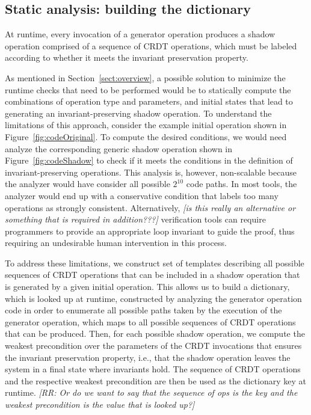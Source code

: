 \subsection{Static analysis: building the dictionary}

At runtime, every invocation of a generator operation produces a
shadow operation comprised of a sequence of CRDT operations, which
must be labeled according to whether it meets the invariant
preservation property.

As mentioned in Section~\ref{sect:overview}, a possible solution to
minimize the runtime checks that need to be performed would be to
statically compute the combinations of operation type and parameters,
and initial states that lead to generating an invariant-preserving
shadow operation. To understand the limitations of this approach,
consider the example initial operation shown in Figure~\ref{fig:codeOriginal}.
To compute the desired conditions, we would need analyze the corresponding
generic shadow operation shown in Figure~\ref{fig:codeShadow} to check if it meets
the conditions in the definition of invariant-preserving operations. This
analysis is, however, non-scalable because the analyzer would have consider
all possible $2^{10}$ code paths. In most tools, the analyzer would end up with
a conservative condition that labels too many operations as strongly
consistent. Alternatively, {\em [is this really an alternative or something
that is required in addition???]} verification tools can require programmers to
provide an appropriate loop invariant to guide the proof, thus requiring an
undesirable human intervention in this process.

To address these limitations, we construct set of templates describing all possible sequences
of CRDT operations that can be included in a shadow operation that is generated by
a given initial operation. This allows us to build a dictionary, which
is looked up at runtime, constructed by analyzing the
generator operation code in order to enumerate all possible paths
taken by the execution of the generator operation, which maps to all
possible sequences
of CRDT operations that can be produced.  Then, for each possible
shadow operation, we compute the weakest precondition over the
parameters of the CRDT invocations that ensures the invariant
preservation property, i.e., that the shadow operation leaves the
system in a final state where invariants hold.
The sequence of CRDT operations and the respective weakest
precondition are then be used as the dictionary key at runtime. 
{\em [RR: Or do we want to say that the sequence of ops is the key and
the weakest precondition is the value that is looked up?]}

